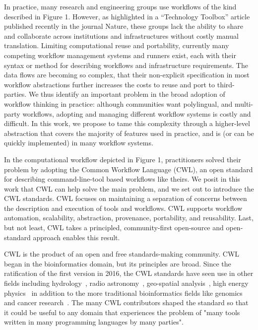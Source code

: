 \documentclass[sigconf,authordraft]{acmart}
\begin{document}
In practice, many research and engineering groups use workflows of
the kind described in Figure 1. However, as highlighted in a
``Technology Toolbox'' article~\cite{perkel_workflow_2019} published recently in
the journal Nature, these groups lack the ability to share and
collaborate across institutions and infrastructures without costly
manual translation. Limiting computational reuse and portability,
currently many competing workflow management systems and runners
exist, each with their syntax or method for describing workflows and
infrastructure requirements. The data flows are becoming so complex,
that their non-explicit specification in most workflow abstractions
further increases the costs to reuse and port to third-parties. We thus
identify an important problem in the broad adoption of workflow thinking
in practice: although communities want polylingual, and multi-party
workflows, adopting and managing different workflow systems is costly
and difficult. In this work, we propose to tame this complexity through
a higher-level abstraction that covers the majority of features used
in practice, and is (or can be quickly implemented) in many workflow
systems.

In the computational workflow depicted in Figure 1, practitioners
solved their problem by adopting the Common Workflow Language (CWL), an
open standard for describing command-line-tool based workflows like
theirs. We posit in this work that CWL can help solve the main problem,
and we set out to introduce the CWL standards. CWL focuses on
maintaining a separation of concerns between the description and
execution of tools and workflows. CWL supports workflow automation,
scalability, abstraction, provenance, portability, and reusability.
Last, but not least, CWL takes a principled, community-first open-source
and open-standard approach enables this result.

CWL is the product of an open and free standards-making community.
CWL began in the bioinformatics domain, but its principles are
broad. Since the ratification of the first version in 2016, the CWL
standards have seen use in other fields including hydrology~\cite{eoscpilot_ewatercycle},
radio astronomy~\cite{eoscpilot-lofar},
geo-spatial analysis~\cite{simonis_ogc_2020,goncalves_ogc_2020,landry_ogc_2020},
high energy physics~\cite{bell_web-based_2017}
in addition to the more traditional bioinformatics fields like genomics
and cancer research~\cite{kaushik_building_2019}. The many CWL contributors shaped the
standard so that it could be useful to any domain that experiences the
problem of "many tools written in many programming languages by many
parties".
\end{document}
